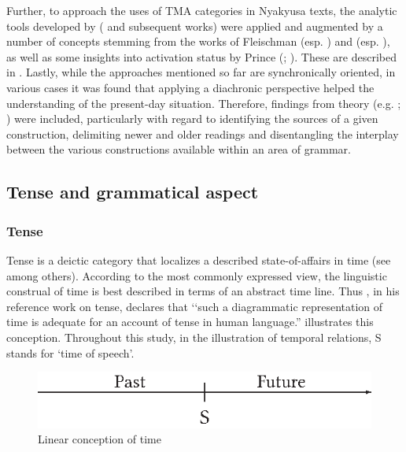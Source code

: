 Further, to approach the uses of TMA categories in Nyakyusa  texts, the analytic tools developed by \citeauthor{LabovWWaletzkyJ1967} (\citeyear{LabovWWaletzkyJ1967} and subsequent works) were applied and augmented by a number of concepts stemming from the works of Fleischman (esp. \citeyear{FleischmanS1990}) and \citeauthor{LongacreR1990} (esp. \citeyear{LongacreR1990}), as well as some insights into activation status by Prince (\citeyear{PrinceEF1981}; \citeyear{PrinceEF1992}). These are described in . Lastly, while the approaches mentioned so far are synchronically oriented, in various cases it was found that applying a diachronic perspective helped the understanding of the present-day situation. Therefore, findings from  theory (e.g. \citealt{HeineBClaudiUHuennemeyerF1991}; \citealt{BybeePerkinsPaglucia1994}) were included, particularly with regard to identifying the sources of a given construction, delimiting newer and older readings and disentangling the interplay between the various constructions available within an area of grammar.
\subsection{Tense and grammatical aspect}\label{TenseAspect}
\subsubsection{Tense}\label{Tense}
Tense is a deictic category that localizes a described state-of-affairs in time (see \citealt{ComrieB1985} among others). According to the most commonly expressed view, the linguistic construal of time is best described in terms of an abstract time line. Thus \citet[2]{ComrieB1985}, in his reference work on tense, declares that \lq\lq such a diagrammatic representation of time is adequate for an account of tense in human language.”  illustrates this conception. Throughout this study, in the illustration of temporal relations, S stands for \lq time of speech’.

\begin{figure}[h]
\begin{center}
\includegraphics{figures/GrafikLinearTime.eps}
\caption{Linear conception of time}
\label{FigureLinearConceptionOfTime}
\end{center}
\end{figure}

